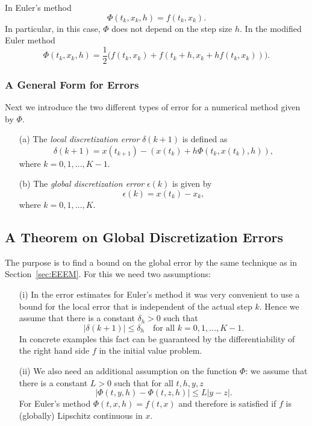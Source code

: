 \documentclass{ximera}
\begin{document}
In Euler's method 
\[
\Phi(t_k,x_k,h)=f(t_k,x_k).
\]
In particular, in this case, $\Phi$ does not depend on the step size $h$.
In the modified Euler method 
\[
\Phi(t_k,x_k,h) = \frac{1}{2}
\Big( f(t_k, x_k)+f(t_k+h, x_k + h f(t_k, x_k))\Big).
\]

\subsubsection*{A General Form for Errors}

Next we introduce the two different types of error for a numerical method
given by $\Phi$.
\begin{Def}
\label{def:errors}
\begin{itemize}
\item[(a)] 
The {\em local discretization error\/} $\delta(k+1)$ is defined as
\[
\delta(k+1) = x(t_{k+1}) - (x(t_k) + h\Phi(t_k,x(t_k),h)),
\]
where $k=0,1,\ldots,K-1$.
\item[(b)] 
The {\em global discretization error\/} $\epsilon(k)$ is given by
\[
\epsilon(k) = x(t_k)-x_k, 
\]
where $k=0,1,\ldots,K$.
\end{itemize}
\end{Def}

\subsection*{A Theorem on Global Discretization Errors}

The purpose is to find a bound on the global error by the same 
technique as in Section~\ref{sec:EEEM}.  For this we need two assumptions:
\begin{itemize}
\item[(i)] In the error estimates for Euler's method it was very convenient 
to use a bound for the local error that is independent of the actual 
step $k$.  Hence we assume that there is a constant $\delta_h>0$ such that
\begin{equation} \label{eq:locerrbound}
|\delta(k+1)| \le \delta_h \quad \mbox{for all $k=0,1,\ldots,K-1$.}
\end{equation}
In concrete examples this fact can be guaranteed by the differentiability
of the right hand side $f$ in the initial value problem.
\item[(ii)] We also need an additional assumption on the function $\Phi$:
we assume that there is a constant $L>0$ such that for all $t,h,y,z$
\begin{equation} \label{eq:PhiLip}
|\Phi(t,y,h)-\Phi(t,z,h)|\le L|y-z|.
\end{equation}
For Euler's method $\Phi(t,x,h)=f(t,x)$ and therefore  is
satisfied if $f$ is (globally) Lipschitz 
continuous in $x$.
\end{itemize}
\end{document}
